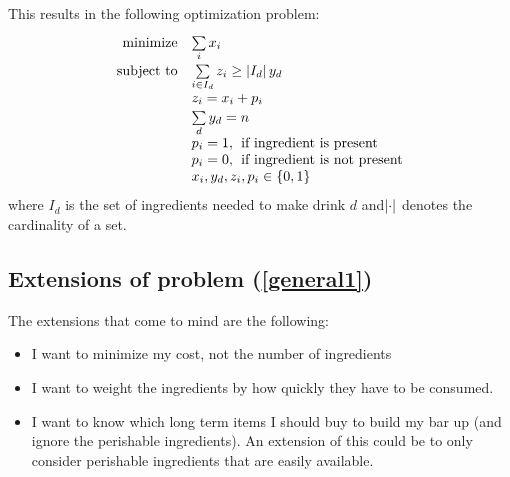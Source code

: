 \documentclass{article}
\begin{document}
This results in the following optimization problem:
\begin{equation}\label{general1}
\begin{array}{rl}
\text{minimize} & \sum \limits_{i}^{\quad} x_i \\
\text{subject to} & \sum \limits_{i\in I_d}^{} z_i \geq \left| I_d \right|y_d \\
& z_i = x_i + p_i \\
& \sum \limits_{d}^{} y_d = n \\
& p_i = 1, \hspace{0.15cm} \text{if ingredient is present} \\
& p_i = 0, \hspace{0.15cm} \text{if ingredient is not present} \\
& x_i,y_d,z_i,p_i \in \{0,1\}
\end{array}
\end{equation}
where $I_d$ is the set of ingredients needed to make drink $d$ and$\left| \cdot \right|$ denotes the cardinality of a set.
\subsection{Extensions of problem (\ref{general1})}
The extensions that come to mind are the following:
\begin{itemize}
\item{I want to minimize my cost, not the number of ingredients}
\item{I want to weight the ingredients by how quickly they have to be consumed.}
\item{I want to know which long term items I should buy to build my bar up (and ignore the perishable ingredients). An extension of this could be to only consider perishable ingredients that are easily available.}
\end{itemize}
\end{document}
